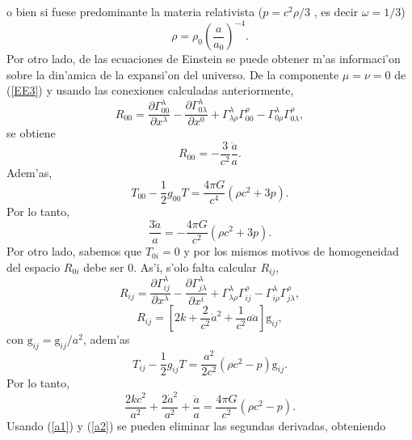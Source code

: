 o bien si fuese predominante la materia relativista ($p=c^{2}\rho/3$ , es decir $\omega = 1/3$)
\begin{equation}
\rho =\rho_0 \left(\frac{a}{a_0}\right)^{-4}. \label{radiacion}
\end{equation}
Por otro lado, de las ecuaciones de Einstein se puede obtener m'as informaci'on sobre la din'amica de la expansi'on del universo. De la componente $\mu=\nu=0$ de (\ref{EE3})
 y usando las conexiones calculadas anteriormente,
\begin{equation}
R_{00}=\frac{\partial\Gamma_{00}^\lambda}{\partial x^\lambda} -\frac{\partial\Gamma_{0\lambda}^\lambda}{\partial x^0}  +\Gamma^\lambda_{\lambda\rho}\Gamma^\rho_{00}  -\Gamma^\lambda_{0\rho}\Gamma^\rho_{0\lambda},          
\end{equation}
se obtiene
\begin{equation}
R_{00}=-\frac{3}{c^2}\frac{\ddot a}{a}.
\end{equation}
Adem'as,
\begin{equation}
T_{00}-\frac{1}{2}g_{00}T=\frac{4\pi G}{c^4}(\rho c^2+3p).
\end{equation}
Por lo tanto,
\begin{equation}
\boxed{\frac{3\ddot a}{a}=-\frac{4\pi G}{c^2}(\rho c^2+3p).} \label{a1}
\end{equation}
Por otro lado, sabemos que $T_{0i}=0$ y por los mismos motivos de homogeneidad del espacio $R_{0i}$ debe ser $0$. As'i, s'olo 
falta calcular $R_{ij}$,
\begin{equation}
R_{ij}=\frac{\partial\Gamma_{ij}^\lambda}{\partial x^\lambda} -\frac{\partial\Gamma_{j\lambda}^\lambda}{\partial x^i}  +\Gamma^\lambda_{\lambda\rho}\Gamma^\rho_{ij}  -\Gamma^\lambda_{i\rho}\Gamma^\rho_{j\lambda},   
\end{equation}
\begin{equation}
R_{ij}= \left[2k +\frac{2}{c^2}\dot a^2 +\frac{1}{c^2}a\ddot a\right] \mbox{\~g}_{ij},
\end{equation}
con $\mbox{\~g}_{ij}=\mbox{g}_{ij}/a^2$, adem'as
\begin{equation}
T_{ij}-\frac{1}{2}g_{ij}T=\frac{a^2}{2c^2}(\rho c^2- p)\mbox{\~g}_{ij}.
\end{equation}
Por lo tanto,
\begin{equation}
\boxed{\frac{2kc^2}{a^2} +\frac{2\dot a^2}{a^2} +\frac{\ddot a}{a}= \frac{4\pi G}{c^2}(\rho c^2- p).} \label{a2}
\end{equation}
Usando (\ref{a1}) y (\ref{a2}) se pueden eliminar las segundas derivadas, obteniendo
